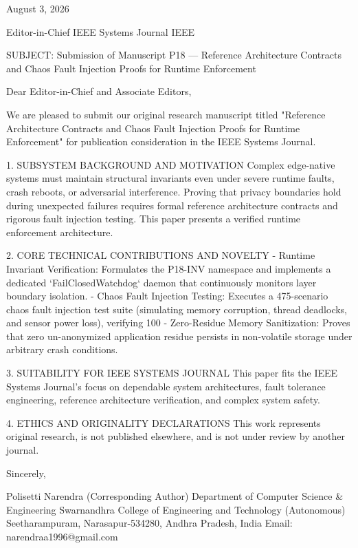 August 3, 2026

Editor-in-Chief
IEEE Systems Journal
IEEE

SUBJECT: Submission of Manuscript P18 — Reference Architecture Contracts and Chaos Fault Injection Proofs for Runtime Enforcement

Dear Editor-in-Chief and Associate Editors,

We are pleased to submit our original research manuscript titled "Reference Architecture Contracts and Chaos Fault Injection Proofs for Runtime Enforcement" for publication consideration in the IEEE Systems Journal.

1. SUBSYSTEM BACKGROUND AND MOTIVATION
Complex edge-native systems must maintain structural invariants even under severe runtime faults, crash reboots, or adversarial interference. Proving that privacy boundaries hold during unexpected failures requires formal reference architecture contracts and rigorous fault injection testing. This paper presents a verified runtime enforcement architecture.

2. CORE TECHNICAL CONTRIBUTIONS AND NOVELTY
  - Runtime Invariant Verification: Formulates the P18-INV namespace and implements a dedicated `FailClosedWatchdog` daemon that continuously monitors layer boundary isolation.
  - Chaos Fault Injection Testing: Executes a 475-scenario chaos fault injection test suite (simulating memory corruption, thread deadlocks, and sensor power loss), verifying 100%
  - Zero-Residue Memory Sanitization: Proves that zero un-anonymized application residue persists in non-volatile storage under arbitrary crash conditions.

3. SUITABILITY FOR IEEE SYSTEMS JOURNAL
This paper fits the IEEE Systems Journal's focus on dependable system architectures, fault tolerance engineering, reference architecture verification, and complex system safety.

4. ETHICS AND ORIGINALITY DECLARATIONS
This work represents original research, is not published elsewhere, and is not under review by another journal.

Sincerely,

Polisetti Narendra (Corresponding Author)
Department of Computer Science & Engineering
Swarnandhra College of Engineering and Technology (Autonomous)
Seetharampuram, Narasapur-534280, Andhra Pradesh, India
Email: narendraa1996@gmail.com
